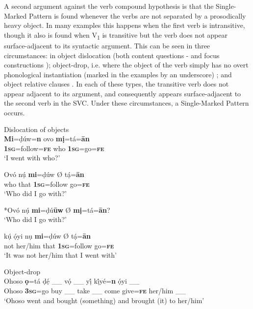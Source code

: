 \documentclass[output=paper]{langsci/langscibook}
\begin{document}
A second argument against the verb compound hypothesis is that the Single-Marked Pattern is found whenever the verbs are not separated by a prosodically heavy object. In many examples this happens when the first verb is intransitive, though it also is found when V\textsubscript{1} is transitive but the verb does not appear surface-adjacent to its syntactic argument. This can be seen in three circumstances: in object dislocation (both content questions - and focus constructions ); object-drop, i.e. where the object of the verb simply has no overt phonological instantiation (marked in the examples by an underscore) ; and object relative clauses . In each of these types, the transitive verb does not appear adjacent to its argument, and consequently appears surface-adjacent to the second verb in the SVC. Under these circumstances, a Single-Marked Pattern occurs.

\ea\label{ex:rolle:disc}
{Dislocation of objects}\\
   \ea\label{ex:rolle:41}
\gll   \textbf{Mi}=ḍúw=\textbf{n}     ovo     \textbf{mị}=tá=\textbf{ān}\\
      \textbf{1}\textbf{\textsc{sg}}=follow=\textbf{\textsc{fe}}   who   \textbf{1}\textbf{\textsc{sg}}=go=\textbf{\textsc{fe}}\\
\glt ‘I went with who?’

\ex\label{ex:rolle:42}
\gll   Ovó   nụ́   \textbf{mi}=ḍúw    Ø  tạ́=\textbf{ān}\\
      who   that   \textbf{1}\textbf{\textsc{sg}}=follow  { }  go=\textbf{\textsc{fe}}\\
\glt ‘Who did I go with?’

\ex\label{ex:rolle:43}
    *Ovó nụ́ \textbf{mi}=ḍú\textbf{ūw} Ø \textbf{mị}=tá=\textbf{ān}?\\
\glt ‘Who did I go with?’

\ex\label{ex:rolle:44}
\gll   kụ́   ọ́yi     nụ     \textbf{mi}=ḍúw   Ø  tạ́=\textbf{ān}\\
       not   her/him   that     \textbf{\textsc{1sg}}=follow  { }   go=\textbf{\textsc{fe}}\\
\glt ‘It was not her/him that I went with’ 
\z
\z 

\ea\label{ex:rolle:45}
{Object-drop}\\
\gll  Ohoso   \textbf{ọ}=tá   ḍẹ́  \_\_   vọ́   \_\_  yị́    kị́yé=\textbf{n}   ọ́yi \_\_ \\
     Ohoso   \textbf{3}\textbf{\textsc{sg}}=go   buy   \_\_  take \_\_  come   give=\textbf{\textsc{fe}}  her/him  \_\_\\
\glt ‘Ohoso went and bought (something) and brought (it) to her/him’ \citep[121]{Kari2004}
\z
\end{document}
